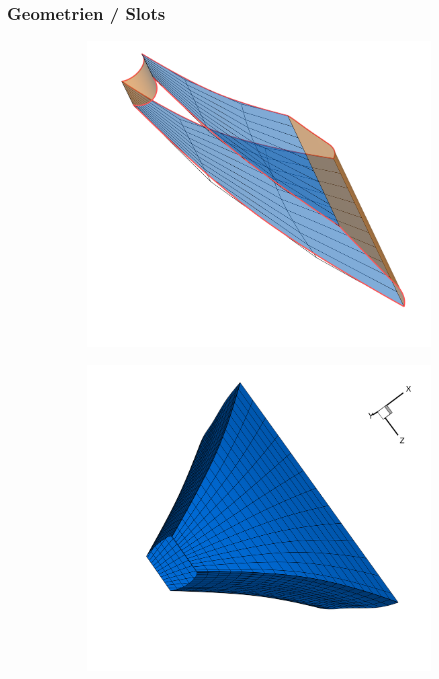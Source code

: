 \documentclass[8pt, aspectratio=169]{beamer}
\begin{document}
\begin{frame}
	\frametitle{Geometrien / Slots}
	\vspace{-1cm}\hspace{-0.5cm}
	\begin{figure}[H]
		\centering
		\begin{subfigure}{.3\textwidth}
			\includegraphics[width=\textwidth]{../../tec/slots/16.png}
		\end{subfigure}
		\begin{subfigure}{.3\textwidth}
			\includegraphics[width=\textwidth]{../../tec/slots/17.png}

\end{subfigure}
\end{figure}
\end{frame}
\end{document}
